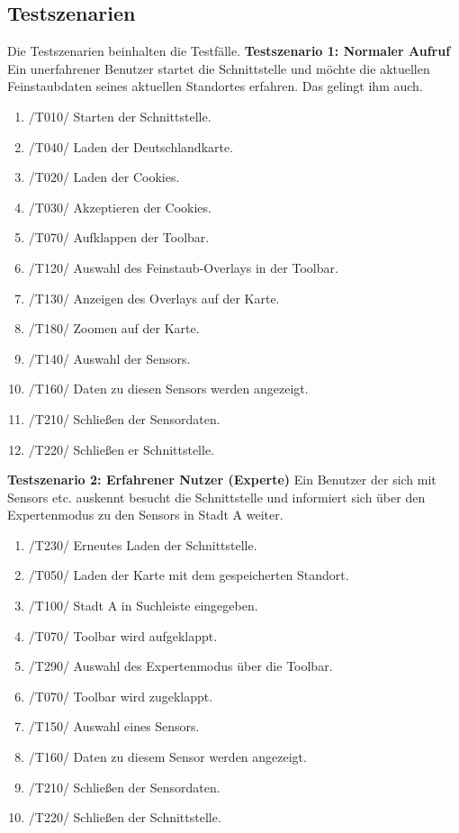 \subsection{Testszenarien}
Die Testszenarien beinhalten die Testfälle. 
\textbf{Testszenario 1: Normaler Aufruf}
\newline
Ein unerfahrener Benutzer startet die Schnittstelle und möchte die aktuellen \gls{Feinstaub}daten seines aktuellen Standortes erfahren. Das gelingt ihm auch.
\begin{enumerate} [noitemsep]
    \item /T010/ Starten der Schnittstelle.
    \item /T040/ Laden der Deutschlandkarte.
    \item /T020/ Laden der \glspl{Cookie}.
    \item /T030/ Akzeptieren der \glspl{Cookie}.
    \item /T070/ Aufklappen der \gls{Toolbar}.
    \item /T120/ Auswahl des \gls{Feinstaub}-Overlays in der \gls{Toolbar}.
    \item /T130/ Anzeigen des Overlays auf der Karte.
    \item /T180/ Zoomen auf der Karte.
    \item /T140/ Auswahl der \glspl{Sensor}.
    \item /T160/ Daten zu diesen \glspl{Sensor} werden angezeigt.
    \item /T210/ Schließen der Sensordaten.
    \item /T220/ Schließen er Schnittstelle.
\end{enumerate}

\textbf{Testszenario 2: Erfahrener Nutzer (Experte)}
\newline
Ein Benutzer der sich mit \glspl{Sensor} etc. auskennt besucht die Schnittstelle und informiert sich über den Expertenmodus zu den \glspl{Sensor} in Stadt A weiter.
\begin{enumerate} [noitemsep]
    \item /T230/ Erneutes Laden der Schnittstelle.
    \item /T050/ Laden der Karte mit dem gespeicherten Standort.
    \item /T100/ Stadt A in Suchleiste eingegeben.
    \item /T070/ \gls{Toolbar} wird aufgeklappt.
    \item /T290/ Auswahl des Expertenmodus über die \gls{Toolbar}.
    \item /T070/ \gls{Toolbar} wird zugeklappt.
    \item /T150/ Auswahl eines Sensors.
    \item /T160/ Daten zu diesem Sensor werden angezeigt.
    \item /T210/ Schließen der Sensordaten.
    \item /T220/ Schließen der Schnittstelle.
\end{enumerate}

